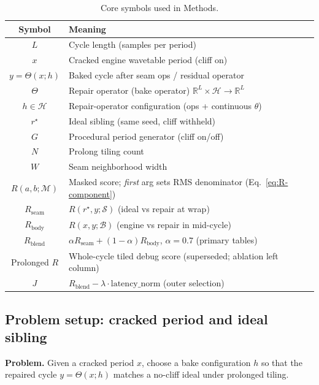 \begin{table}[t]
  \centering
  \caption{Core symbols used in Methods.}
  \label{tab:symbols}
  \setlength{\tabcolsep}{3pt}
\begin{tabular}{@{}cl@{}}
    \toprule
    Symbol & Meaning \\
    \midrule
    $L$ & Cycle length (samples per period) \\
    $x$ & Cracked engine wavetable period (cliff on) \\
    $y=\Theta(x;h)$ & Baked cycle after seam ops / residual operator \\
    $\Theta$ & Repair operator (bake operator) $\mathbb{R}^{L}\times\mathcal{H}\to\mathbb{R}^{L}$ \\
    $h\in\mathcal{H}$ & Repair-operator configuration (ops + continuous $\theta$) \\
    $r^{\star}$ & Ideal sibling (same seed, cliff withheld) \\
    $G$ & Procedural period generator (cliff on/off) \\
    $N$ & Prolong tiling count \\
    $W$ & Seam neighborhood width \\
    $R(a,b;\mathcal{M})$ & Masked score; \emph{first} arg sets RMS denominator (Eq.~\eqref{eq:R-component}) \\
    $R_{\mathrm{seam}}$ & $R(r^{\star},y;\mathcal{S})$ (ideal vs repair at wrap) \\
    $R_{\mathrm{body}}$ & $R(x,y;\mathcal{B})$ (engine vs repair in mid-cycle) \\
    $R_{\mathrm{blend}}$ & $\alpha R_{\mathrm{seam}}+(1-\alpha)R_{\mathrm{body}}$, $\alpha{=}0.7$ (primary tables) \\
    Prolonged $R$ & Whole-cycle tiled debug score (superseded; ablation left column) \\
    $J$ & $R_{\mathrm{blend}}-\lambda\cdot\mathrm{latency\_norm}$ (outer selection) \\
    \bottomrule
  \end{tabular}
\end{table}

\subsection{Problem setup: cracked period and ideal sibling}
\label{sec:ideal-tile}

\textbf{Problem.} Given a cracked period $x$, choose a bake configuration $h$ so that the repaired cycle $y=\Theta(x;h)$ matches a no-cliff ideal under prolonged tiling.


